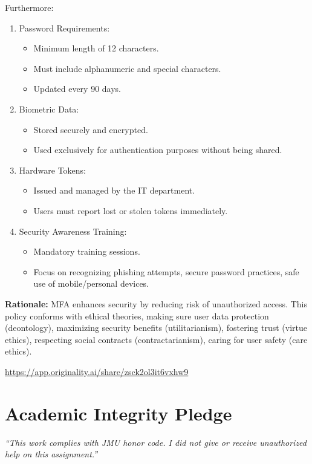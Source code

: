 \documentclass[12pt]{article}
\begin{document}
Furthermore:
\begin{enumerate}
    \item Password Requirements:
    \begin{itemize}
        \item Minimum length of 12 characters.
        \item Must include alphanumeric and special characters.
        \item Updated every 90 days.
    \end{itemize}
    \item Biometric Data:
    \begin{itemize}
        \item Stored securely and encrypted.
        \item Used exclusively for authentication purposes without being shared.
    \end{itemize}
    \item Hardware Tokens:
    \begin{itemize}
        \item Issued and managed by the IT department.
        \item Users must report lost or stolen tokens immediately.
    \end{itemize}
    \item Security Awareness Training:
    \begin{itemize}
        \item Mandatory training sessions.
        \item Focus on recognizing phishing attempts, secure password practices, safe use of mobile/personal devices.
    \end{itemize}
\end{enumerate}


\textbf{Rationale:}
MFA enhances security by reducing risk of unauthorized access. This policy conforms with ethical theories, making sure user data protection (deontology), maximizing security benefits (utilitarianism), fostering trust (virtue ethics), respecting social contracts (contractarianism), caring for user safety (care ethics).

\newpage
\url{https://app.originality.ai/share/zsck2ol3it6vxhw9}

\vfill
\section*{Academic Integrity Pledge}
{\color{red}\textit{“This work complies with JMU honor code. I did not give or receive unauthorized help on this assignment.”}}
\end{document}
